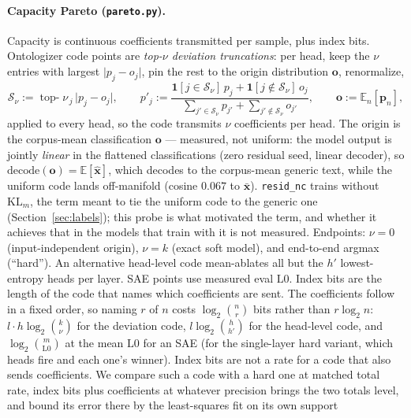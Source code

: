 \paragraph{Capacity Pareto (\texttt{pareto.py}).}
Capacity is continuous coefficients transmitted per sample, plus index
bits. Ontologizer code points are \emph{top-$\nu$ deviation truncations}:
per head, keep the $\nu$ entries with largest $\lvert p_j - o_j\rvert$,
pin the rest to the origin distribution $\mathbf{o}$, renormalize,
\begin{equation}
	\mathcal{S}_\nu := \operatorname*{top-}\nu_{\,j}\, \lvert p_{j} - o_{j}\rvert,
	\qquad
	p'_j := \frac{\mathbf{1}[j \in \mathcal{S}_\nu]\,p_j + \mathbf{1}[j \notin \mathcal{S}_\nu]\,o_j}
	             {\sum_{j' \in \mathcal{S}_\nu} p_{j'} + \sum_{j' \notin \mathcal{S}_\nu} o_{j'}},
	\qquad \mathbf{o} := \mathbb{E}_n[\mathbf{p}_n],
	\label{eq:topdev}
\end{equation}
applied to every head, so the code transmits $\nu$ coefficients per head.
The origin is the
corpus-mean classification $\mathbf{o}$ --- measured, not
uniform: the model output is jointly \emph{linear} in the flattened
classifications (zero residual seed, linear decoder), so
$\mathrm{decode}(\mathbf{o}) = \mathbb{E}[\hat{\mathbf{x}}]$,
which decodes to the corpus-mean generic text, while the uniform code lands
off-manifold (cosine $0.067$ to $\bar{\mathbf{x}}$).
\texttt{resid\_nc} trains without $\mathrm{KL}_m$, the term meant to tie
the uniform code to the generic one (Section~\ref{sec:labels}); this probe
is what motivated the term, and whether it achieves that in the models
that train with it is not measured. Endpoints:
$\nu{=}0$ (input-independent origin), $\nu{=}k$ (exact soft model), and
end-to-end argmax (``hard''). An alternative head-level code mean-ablates
all but the $h'$ lowest-entropy heads per layer. SAE points use measured
eval $\mathrm{L0}$. Index bits are the length of the code that names
which coefficients are sent. The coefficients follow in a fixed order, so
naming $r$ of $n$ costs $\log_2\binom{n}{r}$ bits rather than
$r\log_2 n$: $l\cdot h\log_2\binom{k}{\nu}$ for the deviation code,
$l\log_2\binom{h}{h'}$ for the head-level code, and
$\log_2\binom{m}{\mathrm{L0}}$ at the mean $\mathrm{L0}$ for an SAE (for
the single-layer hard variant, which heads fire and each one's winner).
Index bits are not a rate for a code that also sends coefficients. We
compare such a code with a hard one at matched total rate, index bits
plus coefficients at whatever precision brings the two totals level, and
bound its error there by the least-squares fit on its own support
